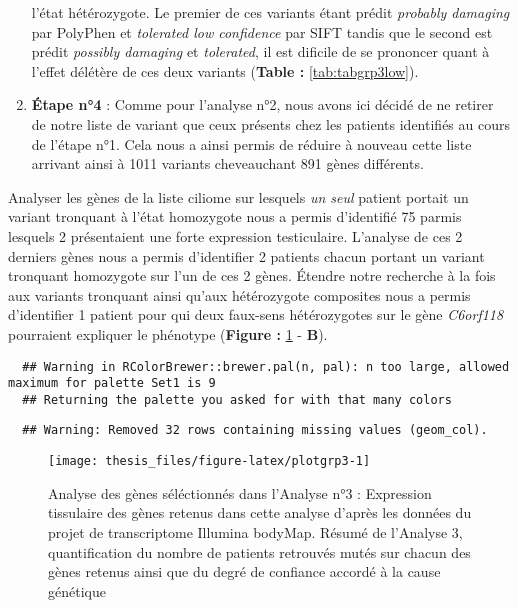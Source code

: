 \documentclass[12pt,twoside]{reedthesis}
\theoremstyle{definition}
\theoremstyle{definition}
\theoremstyle{remark}
\begin{document}
\begin{enumerate}
    l'état hétérozygote. Le premier de ces variants étant prédit
    \emph{probably damaging} par PolyPhen et \emph{tolerated low
    confidence} par SIFT tandis que le second est prédit \emph{possibly
    damaging} et \emph{tolerated}, il est dificile de se prononcer quant à
    l'effet délétère de ces deux variants (\textbf{Table :}
    \ref{tab:tabgrp3low}).
  \item
    \textbf{Étape n°4} : Comme pour l'analyse n°2, nous avons ici décidé
    de ne retirer de notre liste de variant que ceux présents chez les
    patients identifiés au cours de l'étape n°1. Cela nous a ainsi permis
    de réduire à nouveau cette liste arrivant ainsi à 1011 variants
    cheveauchant 891 gènes différents.
  \end{enumerate}
  
  Analyser les gènes de la liste ciliome sur lesquels \emph{un seul}
  patient portait un variant tronquant à l'état homozygote nous a permis
  d'identifié 75 parmis lesquels 2 présentaient une forte expression
  testiculaire. L'analyse de ces 2 derniers gènes nous a permis
  d'identifier 2 patients chacun portant un variant tronquant homozygote
  sur l'un de ces 2 gènes. Étendre notre recherche à la fois aux variants
  tronquant ainsi qu'aux hétérozygote composites nous a permis
  d'identifier 1 patient pour qui deux faux-sens hétérozygotes sur le gène
  \emph{C6orf118} pourraient expliquer le phénotype (\textbf{Figure :}
  \ref{fig:plotgrp3} - \textbf{B}).
  
  \newpage  
  
  \begin{verbatim}
  ## Warning in RColorBrewer::brewer.pal(n, pal): n too large, allowed maximum for palette Set1 is 9
  ## Returning the palette you asked for with that many colors
  \end{verbatim}
  
  \begin{verbatim}
  ## Warning: Removed 32 rows containing missing values (geom_col).
  \end{verbatim}
  
  \begin{figure}
  
  {\centering \texttt{[image: thesis\_files/figure-latex/plotgrp3-1]} 
  
  }
  
  \caption[Analyse des gènes séléctionnés dans l'Analyse n°3]{Analyse des gènes séléctionnés dans l'Analyse n°3 : Expression tissulaire des gènes retenus dans cette analyse d'après les données du projet de transcriptome Illumina bodyMap. Résumé de l'Analyse 3, quantification du nombre de patients retrouvés mutés sur chacun des gènes retenus ainsi que du degré de confiance accordé à la cause génétique}\label{fig:plotgrp3}
  \end{figure}
  
\end{document}
